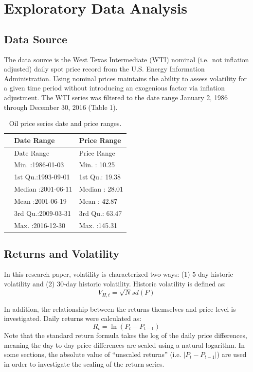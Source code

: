 \documentclass[]{article}
\begin{document}
\section{Exploratory Data Analysis}\label{exploratory-data-analysis}

\subsection{Data Source}\label{data-source}

The data source is the West Texas Intermediate (WTI) nominal (i.e.~not
inflation adjusted) daily spot price record from the U.S. Energy
Information Administration. Using nominal prices maintains the ability
to assess volatility for a given time period without introducing an
exogenious factor via inflation adjustment. The WTI series was filtered
to the date range January 2, 1986 through December 30, 2016 (Table 1).

\begin{longtable}[]{@{}lll@{}}
\caption{Oil price series date and price ranges.}\tabularnewline
\toprule
& Date Range & Price Range\tabularnewline
\midrule
\endfirsthead
\toprule
& Date Range & Price Range\tabularnewline
\midrule
\endhead
& Min. :1986-01-03 & Min. : 10.25\tabularnewline
& 1st Qu.:1993-09-01 & 1st Qu.: 19.38\tabularnewline
& Median :2001-06-11 & Median : 28.01\tabularnewline
& Mean :2001-06-19 & Mean : 42.87\tabularnewline
& 3rd Qu.:2009-03-31 & 3rd Qu.: 63.47\tabularnewline
& Max. :2016-12-30 & Max. :145.31\tabularnewline
\bottomrule
\end{longtable}

\subsection{Returns and Volatility}\label{returns-and-volatility}

In this research paper, volatility is characterized two ways: (1) 5-day
historic volatility and (2) 30-day historic volatility. Historic
volatility is defined as: \[V_{H,t}=\sqrt{N}sd(P)\]

In addition, the relationship between the returns themselves and price
level is investigated. Daily returns were calculated as:
\[R_t = \ln({P_t-P_{t-1}})\] Note that the standard return formula takes
the log of the daily price differences, meaning the day to day price
differences are scaled using a natural logarithm. In some sections, the
absolute value of ``unscaled returns'' (i.e. \(|P_t-P_{t-1}|\)) are used
in order to investigate the scaling of the return series.
\end{document}
